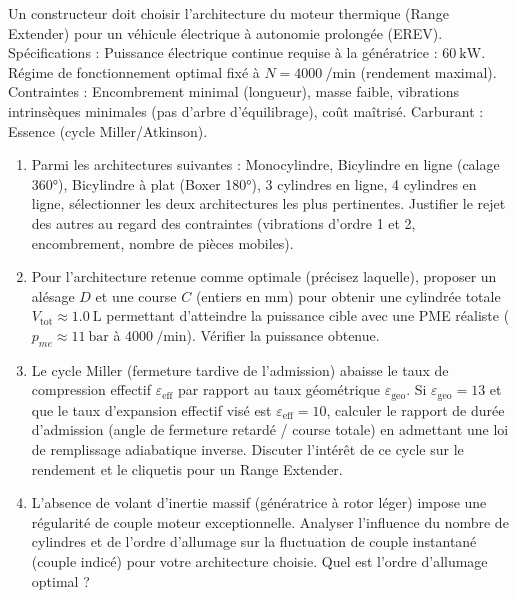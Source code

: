 \documentclass[11pt]{article}
\begin{document}
\begin{exercice}
Un constructeur doit choisir l'architecture du moteur thermique (Range Extender) pour un véhicule électrique à autonomie prolongée (EREV). Spécifications : Puissance électrique continue requise à la génératrice : $\SI{60}{\kilo\watt}$. Régime de fonctionnement optimal fixé à $N = \SI{4000}{\per\minute}$ (rendement maximal). Contraintes : Encombrement minimal (longueur), masse faible, vibrations intrinsèques minimales (pas d'arbre d'équilibrage), coût maîtrisé. Carburant : Essence (cycle Miller/Atkinson).
\begin{enumerate}
    \item Parmi les architectures suivantes : Monocylindre, Bicylindre en ligne (calage 360°), Bicylindre à plat (Boxer 180°), 3 cylindres en ligne, 4 cylindres en ligne, sélectionner les deux architectures les plus pertinentes. Justifier le rejet des autres au regard des contraintes (vibrations d'ordre 1 et 2, encombrement, nombre de pièces mobiles).
    \item Pour l'architecture retenue comme optimale (précisez laquelle), proposer un alésage $D$ et une course $C$ (entiers en mm) pour obtenir une cylindrée totale $V_{\text{tot}} \approx \SI{1.0}{\liter}$ permettant d'atteindre la puissance cible avec une PME réaliste ($p_{me} \approx \SI{11}{\bar}$ à $\SI{4000}{\per\minute}$). Vérifier la puissance obtenue.
    \item Le cycle Miller (fermeture tardive de l'admission) abaisse le taux de compression effectif $\varepsilon_{\text{eff}}$ par rapport au taux géométrique $\varepsilon_{\text{geo}}$. Si $\varepsilon_{\text{geo}} = 13$ et que le taux d'expansion effectif visé est $\varepsilon_{\text{eff}} = 10$, calculer le rapport de durée d'admission (angle de fermeture retardé / course totale) en admettant une loi de remplissage adiabatique inverse. Discuter l'intérêt de ce cycle sur le rendement et le cliquetis pour un Range Extender.
    \item L'absence de volant d'inertie massif (génératrice à rotor léger) impose une régularité de couple moteur exceptionnelle. Analyser l'influence du nombre de cylindres et de l'ordre d'allumage sur la fluctuation de couple instantané (couple indicé) pour votre architecture choisie. Quel est l'ordre d'allumage optimal ?
\end{enumerate}
\end{exercice}
\end{document}
